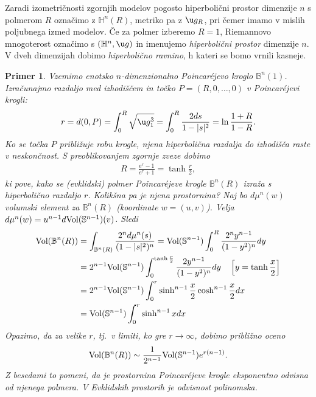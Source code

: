 \documentclass[a4paper]{article}
\newtheorem{primer}{Primer}
\begin{document}
Zaradi izometričnosti zgornjih modelov pogosto hiperbolični prostor dimenzije $n$ s polmerom $R$ označimo z $\mathbb{H}^{n}(R)$, metriko pa z $\u g_{R}$, pri čemer imamo v mislih poljubnega izmed modelov. Če za polmer izberemo $R=1$, Riemannovo mnogoterost označimo s $(\mathbb{H}^{n}, \u g)$ in imenujemo \emph{hiperbolični prostor} dimenzije $n$. V dveh dimenzijah dobimo \emph{hiperbolično ravnino}, h kateri se bomo vrnili kasneje.

\begin{primer}
Vzemimo enotsko $n$-dimenzionalno Poincar\'ejevo kroglo $\mathbb{B}^{n}(1)$. Izračunajmo razdaljo med izhodiščem in točko $P = (R,0, \dots , 0)$ v Poincar\'ejevi krogli:
\begin{gather}
r = d(0, P) = \int_{0}^{R} \sqrt{\u g_{1}^{3}} = \int_{0}^{R} \frac{2ds}{1-|s|^2} = \ln{\frac{1+R}{1-R}}.
\end{gather}
Ko se točka $P$ približuje robu krogle, njena hiperbolična razdalja do izhodišča raste v neskončnost.
S preoblikovanjem zgornje zveze dobimo 
\begin{gather}
R = \frac{e^{r}-1}{e^{r}+1} = \tanh{\frac{r}{2}},
\end{gather}
ki pove, kako se (evklidski) polmer Poincar\'ejeve krogle $\mathbb{B}^{n}(R)$ izraža s hiperbolično razdaljo $r$.\newline 
Kolikšna pa je njena prostornina?
Naj bo $d\mu^{n}(w)$ volumski element za $\mathbb{B}^{n}(R)$ (koordinate $w=(u,v)$). Velja $d\mu^{n}(w) = u^{n-1} d\textup{Vol}(\mathbb{S}^{n-1})(v)$. Sledi 
\begin{align*}
\textup{Vol}(\mathbb{B}^{n}(R)) &= \int_{\mathbb{B}^{n}(R)} \frac{2^{n} d\mu^{n}(s)}{(1-|s|^2)^{n}} = \textup{Vol}(\mathbb{S}^{n-1}) \int_{0}^{R} \frac{2^{n} y^{n-1}}{(1-y^{2})^{n}} dy \\ 
&= 2^{n-1} \textup{Vol}(\mathbb{S}^{n-1}) \int_{0}^{\tanh{\frac{r}{2}}} \frac{2 y^{n-1}}{(1-y^{2})^{n}} dy \quad \left[y = \tanh{\frac{x}{2}} \right] \\
&= 2^{n-1} \textup{Vol}(\mathbb{S}^{n-1}) \int_{0}^{r} \sinh^{n-1}{\frac{x}{2}} \cosh^{n-1}{\frac{x}{2}} dx \\
&= \textup{Vol}(\mathbb{S}^{n-1}) \int_{0}^{r} \sinh^{n-1}{x} dx
\end{align*}
Opazimo, da za velike $r$, tj.~v limiti, ko gre $r \to \infty$, dobimo približno oceno
\begin{gather*}
\textup{Vol}(\mathbb{B}^{n}(R)) \sim \frac{1}{2^{n-1}} \textup{Vol}(\mathbb{S}^{n-1}) e^{r(n-1)}.
\end{gather*}
Z besedami to pomeni, da je prostornina Poincar\'ejeve krogle eksponentno odvisna od njenega polmera. V Evklidskih prostorih je odvisnost polinomska.
\end{primer}
\end{document}
